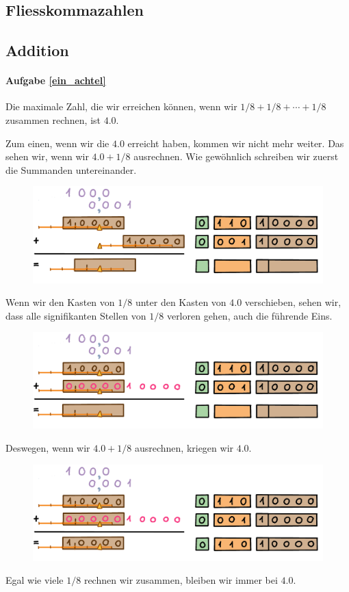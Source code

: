 \subsection{Fliesskommazahlen}

\subsection{Addition}

\paragraph{Aufgabe \ref{ein_achtel}} Die maximale Zahl, die wir erreichen können, wenn wir \(1/8 + 1/8 + \dotsb + 1/8\) zusammen rechnen, ist \(4.0\).

Zum einen, wenn wir die \(4.0\) erreicht haben, kommen wir nicht mehr weiter.
Das sehen wir, wenn wir \(4.0 + 1/8\) ausrechnen. Wie gewöhnlich schreiben wir zuerst die Summanden untereinander.
\begin{figure}[H]
\centering
\includegraphics[width=\linewidth]{Pictures/Addition4and1-8_1.png}
\end{figure}
Wenn wir den Kasten von \(1/8\) unter den Kasten von \(4.0\) verschieben, sehen wir, dass alle signifikanten Stellen von \(1/8\) verloren gehen, auch die führende Eins.
\begin{figure}[H]
\centering
\includegraphics[width=\linewidth]{Pictures/Addition4and1-8_2.png}
\end{figure}
Deswegen, wenn wir \(4.0 + 1/8\) ausrechnen, kriegen wir \(4.0\).
\begin{figure}[H] 
\centering
\includegraphics[width=\linewidth]{Pictures/Addition4and1-8_3.png} 
\end{figure}
Egal wie viele \(1/8\) rechnen wir zusammen, bleiben wir immer bei \(4.0\).


